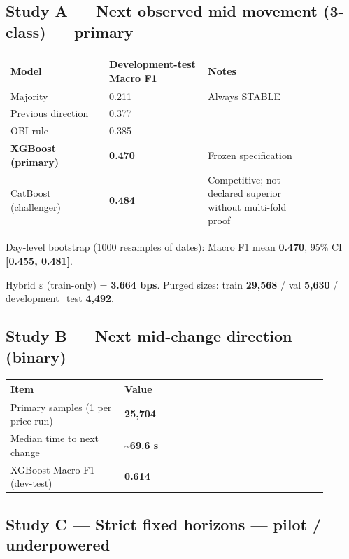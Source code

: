 \documentclass[11pt,a4paper]{article}
\begin{document}
\subsection{Study A --- Next observed mid movement (3-class) --- \textbf{primary}}

\begin{center}
\begin{tabular}{L{0.28\linewidth}L{0.28\linewidth}L{0.28\linewidth}}
\toprule
Model & Development-test Macro F1 & Notes \\
\midrule
Majority & 0.211 & Always STABLE \\
Previous direction & 0.377 &  \\
OBI rule & 0.385 &  \\
\textbf{XGBoost (primary)} & \textbf{0.470} & Frozen specification \\
CatBoost (challenger) & \textbf{0.484} & Competitive; not declared superior without multi-fold proof \\
\bottomrule
\end{tabular}
\end{center}
\vspace{0.35em}

Day-level bootstrap (1000 resamples of dates): Macro F1 mean \textbf{0.470}, 95\% CI \textbf{[0.455, 0.481]}.


Hybrid $\varepsilon$ (train-only) = \textbf{3.664 bps}. Purged sizes: train \textbf{29,568} / val \textbf{5,630} / development\_test \textbf{4,492}.


\subsection{Study B --- Next mid-change direction (binary)}

\begin{center}
\begin{tabular}{L{0.32\linewidth}L{0.58\linewidth}}
\toprule
Item & Value \\
\midrule
Primary samples (1 per price run) & \textbf{25,704} \\
Median time to next change & \textbf{\textasciitilde{}69.6 s} \\
XGBoost Macro F1 (dev-test) & \textbf{0.614} \\
\bottomrule
\end{tabular}
\end{center}
\vspace{0.35em}

\subsection{Study C --- Strict fixed horizons --- \textbf{pilot / underpowered}}
\end{document}
